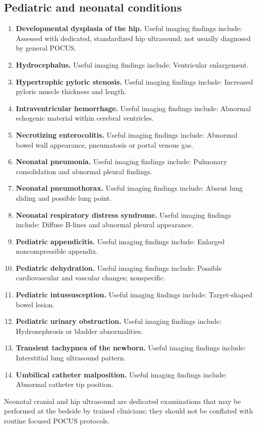 \subsection{Pediatric and neonatal conditions}
\begin{enumerate}[leftmargin=*,itemsep=0.45em,topsep=0.4em]
\item \textbf{Developmental dysplasia of the hip.} Useful imaging findings include: Assessed with dedicated, standardized hip ultrasound; not usually diagnosed by general POCUS.
\item \textbf{Hydrocephalus.} Useful imaging findings include: Ventricular enlargement.
\item \textbf{Hypertrophic pyloric stenosis.} Useful imaging findings include: Increased pyloric muscle thickness and length.
\item \textbf{Intraventricular hemorrhage.} Useful imaging findings include: Abnormal echogenic material within cerebral ventricles.
\item \textbf{Necrotizing enterocolitis.} Useful imaging findings include: Abnormal bowel wall appearance, pneumatosis or portal venous gas.
\item \textbf{Neonatal pneumonia.} Useful imaging findings include: Pulmonary consolidation and abnormal pleural findings.
\item \textbf{Neonatal pneumothorax.} Useful imaging findings include: Absent lung sliding and possible lung point.
\item \textbf{Neonatal respiratory distress syndrome.} Useful imaging findings include: Diffuse B-lines and abnormal pleural appearance.
\item \textbf{Pediatric appendicitis.} Useful imaging findings include: Enlarged noncompressible appendix.
\item \textbf{Pediatric dehydration.} Useful imaging findings include: Possible cardiovascular and vascular changes; nonspecific.
\item \textbf{Pediatric intussusception.} Useful imaging findings include: Target-shaped bowel lesion.
\item \textbf{Pediatric urinary obstruction.} Useful imaging findings include: Hydronephrosis or bladder abnormalities.
\item \textbf{Transient tachypnea of the newborn.} Useful imaging findings include: Interstitial lung ultrasound pattern.
\item \textbf{Umbilical catheter malposition.} Useful imaging findings include: Abnormal catheter tip position.
\end{enumerate}
Neonatal cranial and hip ultrasound are dedicated examinations that may be performed at the bedside by trained clinicians; they should not be conflated with routine focused POCUS protocols.


